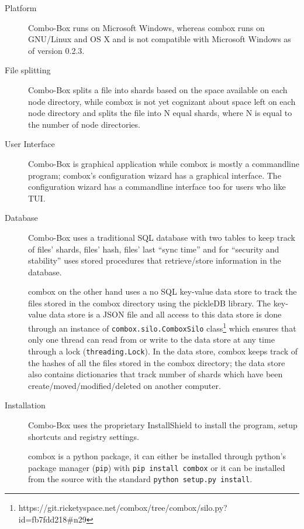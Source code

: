 \begin{description}
\item[Platform] Combo-Box runs on Microsoft Windows, whereas combox
  runs on GNU/Linux and OS X and is not compatible with Microsoft
  Windows as of version 0.2.3.
\item[File splitting] Combo-Box splits a file into shards based on the
  space available on each node directory\cite{vollmar-combo-box},
  while combox is not yet cognizant about space left on each node
  directory and splits the file into N equal shards, where N is equal
  to the number of node directories.
\item[User Interface] Combo-Box is graphical application while combox
  is mostly a commandline program; combox's configuration wizard has a
  graphical interface. The configuration wizard has a commandline
  interface too for users who like TUI.
\item[Database] Combo-Box uses a traditional SQL database with two
  tables to keep track of files' shards, files' hash, files' last
  ``sync time'' and for ``security and stability'' uses stored
  procedures that retrieve/store information in the
  database\cite{vollmar-combo-box}.

  combox on the other hand uses a no SQL key-value data store to track
  the files stored in the combox directory using the pickleDB
  library\cite{pylib:pickledb}. The key-value data store is a JSON
  file and all access to this data store is done through an instance
  of \verb+combox.silo.ComboxSilo+
  class\footnote{https://git.ricketyspace.net/combox/tree/combox/silo.py?id=fb7fdd218\#n29}
  which ensures that only one thread can read from or write to the
  data store at any time through a lock (\verb+threading.Lock+). In
  the data store, combox keeps track of the hashes of all the files
  stored in the combox directory; the data store also contains
  dictionaries that track number of shards which have been
  create/moved/modified/deleted on another computer.

\item[Installation] Combo-Box uses the proprietary
  InstallShield\cite{nonfree-installshield} to install the program,
  setup shortcuts and registry settings\cite{vollmar-combo-box}.

  combox is a python package, it can either be installed through
  python's package manager (\verb+pip+\cite{py:pip}) with
  \verb+pip install combox+ or it can be installed from the source
  with the standard \verb+python setup.py install+.


\end{description}
